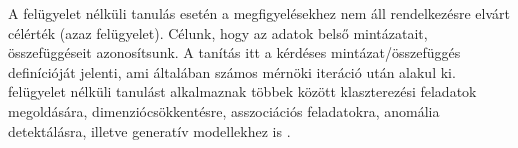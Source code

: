 A felügyelet nélküli tanulás esetén a megfigyelésekhez nem áll rendelkezésre elvárt célérték (azaz felügyelet). Célunk, hogy az adatok belső mintázatait, összefüggéseit azonosítsunk. A tanítás itt a kérdéses mintázat/összefüggés definícióját jelenti, ami általában számos mérnöki iteráció után alakul ki. felügyelet nélküli tanulást alkalmaznak többek között klaszterezési feladatok megoldására, dimenziócsökkentésre, asszociációs feladatokra, anomália detektálásra, illetve generatív modellekhez is \cite{ghahramani2003unsupervised}.



